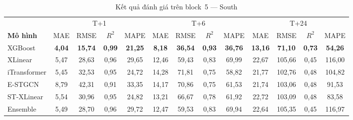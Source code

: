 \begin{table}[H]
\centering
\caption{Kết quả đánh giá trên block~5 --- South}
\label{tab:block5_south}
\small
\begin{tabular}{l|cccc|cccc|cccc}
\toprule
 & \multicolumn{4}{c|}{T+1} & \multicolumn{4}{c|}{T+6} & \multicolumn{4}{c}{T+24} \\
\textbf{Mô hình} & MAE & RMSE & $R^2$ & MAPE & MAE & RMSE & $R^2$ & MAPE & MAE & RMSE & $R^2$ & MAPE \\
\midrule
XGBoost     & \textbf{4,04} & \textbf{15,74} & \textbf{0,99} & \textbf{21,25} & \textbf{8,18} & \textbf{36,54} & \textbf{0,93} & \textbf{36,76} & \textbf{13,16} & \textbf{71,10} & \textbf{0,73} & \textbf{54,26} \\
XLinear     & 5,47 & 28,63 & 0,96 & 29,65 & 12,46 & 59,43 & 0,83 & 69,99 & 22,67 & 105,66 & 0,45 & 116,00 \\
iTransformer & 5,45 & 32,53 & 0,95 & 24,72 & 14,28 & 71,81 & 0,75 & 58,82 & 21,77 & 102,76 & 0,48 & 104,82 \\
E-STGCN     & 8,79 & 42,31 & 0,91 & 33,35 & 14,17 & 70,86 & 0,75 & 61,53 & 21,74 & 103,06 & 0,48 & 91,53 \\
ST-XLinear  & 5,54 & 30,96 & 0,95 & 24,82 & 13,21 & 66,67 & 0,78 & 61,92 & 22,72 & 103,09 & 0,48 & 83,58 \\
Ensemble    & 5,49 & 28,70 & 0,96 & 29,72 & 12,47 & 59,53 & 0,83 & 69,94 & 22,64 & 105,35 & 0,45 & 116,97 \\
\bottomrule
\end{tabular}
\end{table}


